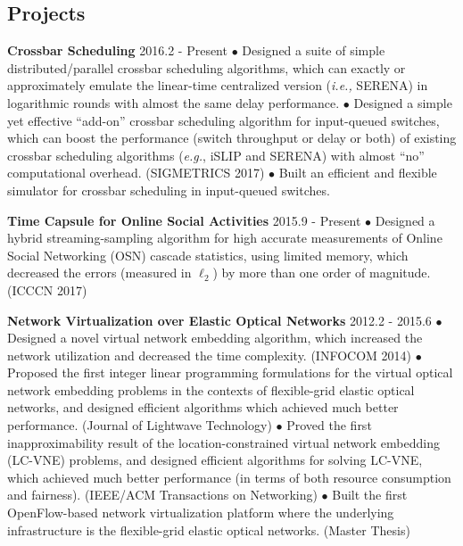 \documentclass[line,11pt,letter]{includes/cls/myRes}
\begin{document}
\begin{resume}
\section{Projects}
\vspace{-4pt}
{\setlength{\parskip}{0pt}
{\bf Crossbar Scheduling} \hfill 2016.2 - Present\break
{\hspace*{1em} $\bullet$ Designed a suite of simple distributed/parallel crossbar scheduling algorithms, which can exactly or approximately emulate the linear-time centralized version ({\it i.e.,} SERENA) in logarithmic rounds with almost the same delay performance.\hfill\break}
{\hspace*{1em} $\bullet$ Designed a simple yet effective ``add-on'' crossbar scheduling algorithm for input-queued switches, which can boost the performance (switch throughput or delay or both) of existing crossbar scheduling algorithms ({\it e.g.}, iSLIP and SERENA) with almost ``no'' computational overhead. (SIGMETRICS 2017)\hfill\break}
{\hspace*{1em} $\bullet$ Built an efficient and flexible simulator for crossbar scheduling in input-queued switches.\hfill\break}
\sspace

}
{\setlength{\parskip}{0pt}
{\bf Time Capsule for Online Social Activities} \hfill 2015.9 - Present\break
{\hspace*{1em} $\bullet$ Designed a hybrid streaming-sampling algorithm for high accurate measurements of Online Social Networking (OSN) cascade statistics, using limited memory, which decreased the errors (measured in $\ell_2$) by more than one order of magnitude. (ICCCN 2017)\hfill\break}
\sspace

}
{\setlength{\parskip}{0pt}
{\bf Network Virtualization over Elastic Optical Networks} \hfill 2012.2 - 2015.6\break
{\hspace*{1em} $\bullet$ Designed a novel virtual network embedding algorithm, which increased the network utilization and decreased the time complexity. (INFOCOM 2014)\hfill\break}
{\hspace*{1em} $\bullet$ Proposed the first integer linear programming formulations for the virtual optical network embedding problems in the contexts of flexible-grid elastic optical networks, and designed efficient algorithms which achieved much better performance. (Journal of Lightwave Technology)\hfill\break}
{\hspace*{1em} $\bullet$ Proved the first inapproximability result of the location-constrained virtual network embedding (LC-VNE) problems, and designed efficient algorithms for solving LC-VNE, which achieved much better performance (in terms of both resource consumption and fairness). (IEEE/ACM Transactions on Networking)\hfill\break}
{\hspace*{1em} $\bullet$ Built the first OpenFlow-based network virtualization platform where the underlying infrastructure is the flexible-grid elastic optical networks. (Master Thesis)\hfill\break}
}
\negspace

\end{resume}
\end{document}
